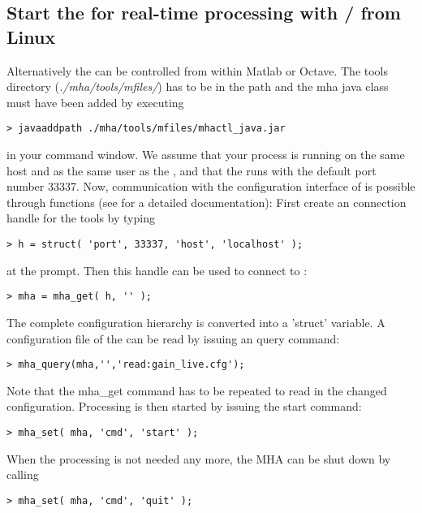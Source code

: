 \subsection{Start the \mha{} for real-time processing with \Octave{}/\Matlab{} from Linux}%
%
Alternatively the \mhad{} can be controlled from within Matlab or Octave.
%
The \mha{} \Matlab{} tools directory (\emph{./mha/tools/mfiles/}) has to
be in the \Matlab{} path and the mha java class must have been added by executing
\begin{verbatim}
> javaaddpath ./mha/tools/mfiles/mhactl_java.jar
\end{verbatim}
in your \Matlab{} command window.
%
We assume that your \Matlab{} process is running on the same host and
as the same user as the \mha{}, and that the \mhad{} runs with the
default port number 33337.
%
Now, communication with the configuration interface of \mha{} is
possible through \mha{} \Matlab{} functions (see 
for a detailed documentation):
%
First create an \mha{} connection handle for the \Matlab{} tools by
typing
\begin{verbatim}
> h = struct( 'port', 33337, 'host', 'localhost' );
\end{verbatim}
at the \Matlab{} prompt. Then this handle can be used to connect to \mha{}:
%
\begin{verbatim}
> mha = mha_get( h, '' );
\end{verbatim}
%
The complete \mha{} configuration hierarchy is converted into a \Matlab{}
'struct' variable.
%
A configuration file of the \mhad{} can be
read by issuing an \mha{} query command:
%
\begin{verbatim}
> mha_query(mha,'','read:gain_live.cfg');
\end{verbatim}
%
Note that the mha\_get command has to be repeated to read in the changed configuration.
%
Processing is then started by issuing the start command:
\begin{verbatim}
> mha_set( mha, 'cmd', 'start' );
\end{verbatim}
When the \mha{} processing is not needed any more, the MHA can be shut
down by calling
%
\begin{verbatim}
> mha_set( mha, 'cmd', 'quit' );
\end{verbatim}
